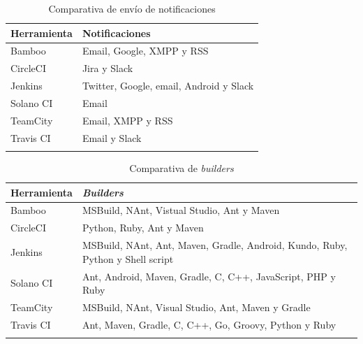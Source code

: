 \begin{center}
\begin{longtable}{p{} p{}}
\hline \hline
  \textbf{Herramienta} & \textbf{Notificaciones} \\
    \hline \hline
    Bamboo & Email, Google, XMPP y RSS\\
    \hline\hline
    CircleCI & Jira y Slack\\
    \hline\hline
    Jenkins & Twitter, Google, email,
Android y Slack\\
    \hline\hline
      Solano CI & Email\\
    \hline\hline
    TeamCity & Email, XMPP y RSS\\
    \hline\hline
    Travis CI & Email y Slack\\
    \hline\hline    
    
\caption{Comparativa de envío de notificaciones}
\end{longtable}
\end{center}

\clearpage

\begin{center}
\begin{longtable}{p{} p{}}
\hline \hline
  \textbf{Herramienta} & \textbf{\textit{Builders}} \\
    \hline \hline
    Bamboo & MSBuild, NAnt, Vistual Studio, Ant y Maven\\
    \hline\hline
    CircleCI & Python, Ruby, Ant y Maven\\
    \hline\hline
    Jenkins & MSBuild, NAnt, Ant, Maven, Gradle, Android, Kundo, Ruby, Python y Shell script\\
    \hline\hline
      Solano CI & Ant, Android, Maven, Gradle, C, C++, JavaScript, PHP y Ruby\\
    \hline\hline
    TeamCity & MSBuild, NAnt, Visual Studio, Ant, Maven y Gradle\\
    \hline\hline
    Travis CI & Ant, Maven, Gradle, C, C++, Go, Groovy, Python y Ruby\\
    \hline\hline    
    
\caption{Comparativa de \textit{builders}}
\end{longtable}
\end{center}

\clearpage

